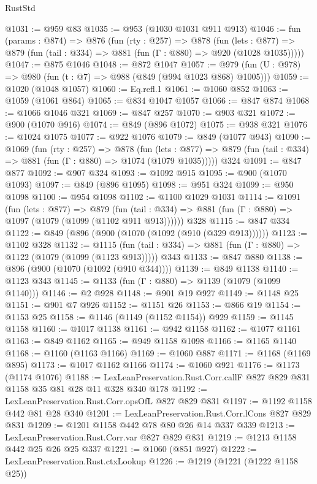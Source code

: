 \begin{lexlean}{RustStd}
\begin{coremodule}
@1031 := @959 @83
@1035 := @953 (@1030 @1031 @911 @913)
@1046 := fun (params : @874) =>
  @876
    (fun (rty : @257) =>
    @878
      (fun (lets : @877) =>
      @879 (fun (tail : @334) => @881 (fun (Γ : @880) => @920 (@1028 @1035)))))
@1047 := @875 @1046
@1048 := @872 @1047
@1057 := @979 (fun (U : @978) => @980 (fun (t : @7) => @988 (@849 (@994 @1023 @868) @1005)))
@1059 := @1020 (@1048 @1057)
@1060 := Eq.refl.{1}
@1061 := @1060 @852
@1063 := @1059 (@1061 @864)
@1065 := @834 @1047 @1057
@1066 := @847 @874
@1068 := @1066 @1046 @321
@1069 := @847 @257
@1070 := @903 @321
@1072 := @900 (@1070 @916)
@1074 := @849 (@896 @1072)
@1075 := @938 @321
@1076 := @1024 @1075
@1077 := @922 @1076
@1079 := @849 (@1077 @943)
@1090 := @1069
    (fun (rty : @257) =>
    @878
      (fun (lets : @877) =>
      @879 (fun (tail : @334) => @881 (fun (Γ : @880) => @1074 (@1079 @1035)))))
    @324
@1091 := @847 @877
@1092 := @907 @324
@1093 := @1092 @915
@1095 := @900 (@1070 @1093)
@1097 := @849 (@896 @1095)
@1098 := @951 @324
@1099 := @950 @1098
@1100 := @954 @1098
@1102 := @1100 @1029 @1031
@1114 := @1091
    (fun (lets : @877) =>
    @879 (fun (tail : @334) => @881 (fun (Γ : @880) => @1097 (@1079 (@1099 (@1102 @911 @913))))))
    @328
@1115 := @847 @334
@1122 := @849 (@896 (@900 (@1070 (@1092 (@910 (@329 @913))))))
@1123 := @1102 @328
@1132 := @1115
    (fun (tail : @334) => @881 (fun (Γ : @880) => @1122 (@1079 (@1099 (@1123 @913)))))
    @343
@1133 := @847 @880
@1138 := @896 (@900 (@1070 (@1092 (@910 @344))))
@1139 := @849 @1138
@1140 := @1123 @343
@1145 := @1133 (fun (Γ : @880) => @1139 (@1079 (@1099 @1140)))
@1146 := @2 @928
@1148 := @901 @19 @927
@1149 := @1148 @25
@1151 := @901 @7 @926
@1152 := @1151 @26
@1153 := @866 @19
@1154 := @1153 @25
@1158 := @1146 (@1149 (@1152 @1154)) @929
@1159 := @1145 @1158
@1160 := @1017 @1138
@1161 := @942 @1158
@1162 := @1077 @1161
@1163 := @849 @1162
@1165 := @949 @1158 @1098
@1166 := @1165 @1140
@1168 := @1160 (@1163 @1166)
@1169 := @1060 @887
@1171 := @1168 (@1169 @895)
@1173 := @1017 @1162 @1166
@1174 := @1060 @921
@1176 := @1173 (@1174 @1076)
@1188 := LexLeanPreservation.Rust.Corr.callF @827 @829 @831 @1158 @35 @81 @28 @11 @328 @340 @178
@1192 := LexLeanPreservation.Rust.Corr.opsOfL @827 @829 @831
@1197 := @1192 @1158 @442 @81 @28 @340
@1201 := LexLeanPreservation.Rust.Corr.lCons @827 @829 @831
@1209 := @1201 @1158 @442 @78 @80 @26 @14 @337 @339
@1213 := LexLeanPreservation.Rust.Corr.var @827 @829 @831
@1219 := @1213 @1158 @442 @25 @26 @25 @337
@1221 := @1060 (@851 @927)
@1222 := LexLeanPreservation.Rust.ctxLookup
@1226 := @1219 (@1221 (@1222 @1158 @25))

\end{coremodule}
\end{lexlean}
